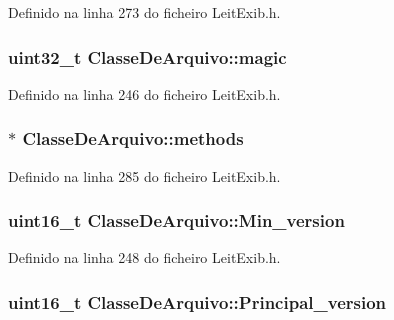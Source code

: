 Definido na linha 273 do ficheiro Leit\-Exib.\-h.

\hypertarget{struct_classe_de_arquivo_a57331bb82cd19880ff79226bb2432fae}{
\subsubsection[{magic}]{\setlength{\rightskip}{0pt plus 5cm}uint32\-\_\-t Classe\-De\-Arquivo\-::magic}}\label{struct_classe_de_arquivo_a57331bb82cd19880ff79226bb2432fae}


Definido na linha 246 do ficheiro Leit\-Exib.\-h.

\hypertarget{struct_classe_de_arquivo_a2b6a999458d5759967527d26a3219450}{
\subsubsection[{methods}]{$\ast$ Classe\-De\-Arquivo\-::methods}}\label{struct_classe_de_arquivo_a2b6a999458d5759967527d26a3219450}


Definido na linha 285 do ficheiro Leit\-Exib.\-h.

\hypertarget{struct_classe_de_arquivo_a1a97a970253c7f8651cf450a5dbc98a7}{
\subsubsection[{Min\-\_\-version}]{\setlength{\rightskip}{0pt plus 5cm}uint16\-\_\-t Classe\-De\-Arquivo\-::\-Min\-\_\-version}}\label{struct_classe_de_arquivo_a1a97a970253c7f8651cf450a5dbc98a7}


Definido na linha 248 do ficheiro Leit\-Exib.\-h.

\hypertarget{struct_classe_de_arquivo_a6f45d7c9f0026ebf84d4c83c46fcc547}{
\subsubsection[{Principal\-\_\-version}]{\setlength{\rightskip}{0pt plus 5cm}uint16\-\_\-t Classe\-De\-Arquivo\-::\-Principal\-\_\-version}}\label{struct_classe_de_arquivo_a6f45d7c9f0026ebf84d4c83c46fcc547}


